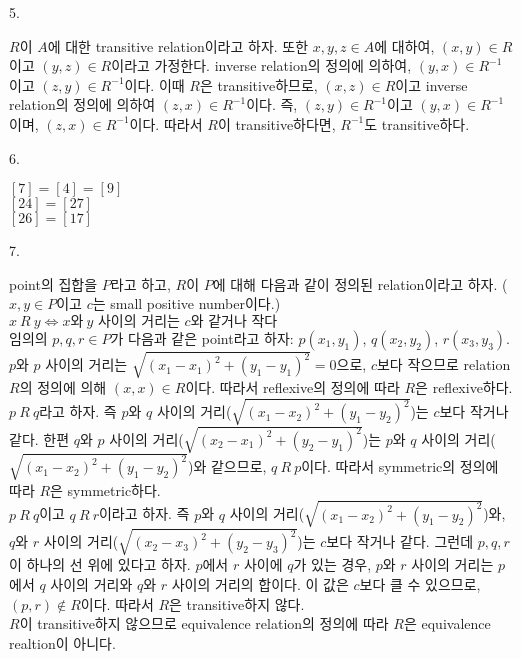 \documentclass{article}
\begin{document}
5.
\begin{addmargin}[1em]{2em}
$R$이 $A$에 대한 transitive relation이라고 하자. 또한 $x, y,z \in A$에 대하여, $(x,y)\in R$이고 $(y,z)\in R$이라고 가정한다. inverse relation의 정의에 의하여, $(y,x)\in R^{-1}$이고 $(z,y)\in R^{-1}$이다. 이때 $R$은 transitive하므로, $(x, z) \in R$이고 inverse relation의 정의에 의하여 $(z, x) \in R^{-1}$이다. 즉, $(z,y)\in R^{-1}$이고 $(y,x)\in R^{-1}$이며, $(z, x) \in R^{-1}$이다. 
따라서 $R$이 transitive하다면, $R^{-1}$도 transitive하다.
\end{addmargin}
\bigskip

6.
\begin{addmargin}[1em]{2em}
$[7]=[4]=[9]$ \\
$[24]=[27]$ \\
$[26]=[17]$

\end{addmargin}
\bigskip

7.
\begin{addmargin}[1em]{2em}
point의 집합을 $P$라고 하고, $R$이 $P$에 대해 다음과 같이 정의된 relation이라고 하자. ($x,y\in P$이고 $c$는 small positive number이다.) \\
$x\ R\ y \Leftrightarrow x\mbox{와}\ y\mbox{ 사이의 거리는 }c\mbox{와 같거나 작다}$\\
임의의 $p,q,r\in P$가 다음과 같은 point라고 하자: $p(x_1,y_1)$, $q(x_2,y_2)$, $r(x_3,y_3)$.\\
$p$와 $p$ 사이의 거리는 $\sqrt{(x_1-x_1)^2+(y_1-y_1)^2}=0$으로, $c$보다 작으므로 relation $R$의 정의에 의해 $(x,x)\in R$이다. 따라서 reflexive의 정의에 따라 $R$은 reflexive하다. \\
$p\ R\ q$라고 하자. 즉 $p$와 $q$ 사이의 거리($\sqrt{(x_1-x_2)^2+(y_1-y_2)^2}$)는 $c$보다 작거나 같다. 한편 $q$와 $p$ 사이의 거리($\sqrt{(x_2-x_1)^2+(y_2-y_1)^2}$)는 $p$와 $q$ 사이의 거리($\sqrt{(x_1-x_2)^2+(y_1-y_2)^2}$)와 같으므로, $q\ R\ p$이다. 따라서 symmetric의 정의에 따라 $R$은 symmetric하다. \\
$p\ R\ q$이고 $q\ R\ r$이라고 하자. 즉 $p$와 $q$ 사이의 거리($\sqrt{(x_1-x_2)^2+(y_1-y_2)^2}$)와, $q$와 $r$ 사이의 거리($\sqrt{(x_2-x_3)^2+(y_2-y_3)^2}$)는 $c$보다 작거나 같다. 그런데 $p, q, r$이 하나의 선 위에 있다고 하자. $p$에서 $r$ 사이에 $q$가 있는 경우, $p$와 $r$ 사이의 거리는 $p$에서 $q$ 사이의 거리와 $q$와 $r$ 사이의 거리의 합이다. 이 값은 $c$보다 클 수 있으므로, $(p,r)\notin R$이다. 따라서 $R$은 transitive하지 않다.\\
$R$이 transitive하지 않으므로 equivalence relation의 정의에 따라 $R$은 equivalence realtion이 아니다.
\end{addmargin}
\bigskip
\end{document}

